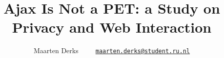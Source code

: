 \documentclass[a4paper]{article}
\title{Ajax Is Not a PET: a Study on Privacy and Web Interaction}
\author{Maarten Derks~~~~~\href{mailto:maarten.derks@student.ru.nl}{\nolinkurl{maarten.derks@student.ru.nl}}}
\begin{document}
	\maketitle
	
	
	
	
	
	
		

    \nocite{*}
    
	
	
\end{document}
